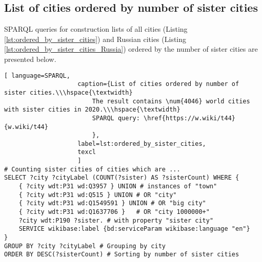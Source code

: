 \subsection{List of cities ordered by number of sister cities}

SPARQL queries for construction lists of all cities (Listing \ref{lst:ordered_by_sister_cities}) and Russian cities (Listing \ref{lst:ordered_by_sister_cities_Russia}) ordered by the number of sister cities are presented below.


\begin{lstlisting}[ language=SPARQL, 
                    caption={List of cities ordered by number of sister cities.\\\hspace{\textwidth}
                        The result contains \num{4046} world cities with sister cities in 2020.\\\hspace{\textwidth}
                        SPARQL query: \href{https://w.wiki/t44}{w.wiki/t44}
                        },
                    label=lst:ordered_by_sister_cities,
                    texcl 
                    ]
# Counting sister cities of cities which are ...
SELECT ?city ?cityLabel (COUNT(?sister) AS ?sisterCount) WHERE {           
	{ ?city wdt:P31 wd:Q3957 } UNION # instances of "town"
	{ ?city wdt:P31 wd:Q515 } UNION # OR "city"
	{ ?city wdt:P31 wd:Q1549591 } UNION # OR "big city"
	{ ?city wdt:P31 wd:Q1637706 }	# OR "city 1000000+"
	?city wdt:P190 ?sister. # with property "sister city"
	SERVICE wikibase:label {bd:serviceParam wikibase:language "en"}
}
GROUP BY ?city ?cityLabel # Grouping by city                                   
ORDER BY DESC(?sisterCount) # Sorting by number of sister cities
\end{lstlisting}%

